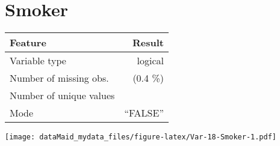 \documentclass[]{report}
\begin{document}
\noindent\makebox[\linewidth]{\rule{\textwidth}{0.4pt}}

\hypertarget{smoker}{%
\section{Smoker}\label{smoker}}

\begin{minipage}{0.75 \textwidth}

\begin{longtable}[]{@{}lr@{}}
\toprule
\begin{minipage}[b]{0.34\columnwidth}\raggedright
Feature\strut
\end{minipage} & \begin{minipage}[b]{0.16\columnwidth}\raggedleft
Result\strut
\end{minipage}\tabularnewline
\midrule
\endhead
\begin{minipage}[t]{0.34\columnwidth}\raggedright
Variable type\strut
\end{minipage} & \begin{minipage}[t]{0.16\columnwidth}\raggedleft
logical\strut
\end{minipage}\tabularnewline
\begin{minipage}[t]{0.34\columnwidth}\raggedright
Number of missing obs.\strut
\end{minipage} & \begin{minipage}[t]{0.16\columnwidth}\raggedleft
1 (0.4 \%)\strut
\end{minipage}\tabularnewline
\begin{minipage}[t]{0.34\columnwidth}\raggedright
Number of unique values\strut
\end{minipage} & \begin{minipage}[t]{0.16\columnwidth}\raggedleft
2\strut
\end{minipage}\tabularnewline
\begin{minipage}[t]{0.34\columnwidth}\raggedright
Mode\strut
\end{minipage} & \begin{minipage}[t]{0.16\columnwidth}\raggedleft
``FALSE''\strut
\end{minipage}\tabularnewline
\bottomrule
\end{longtable}

\end{minipage}
\begin{minipage}{0.25 \textwidth}

\texttt{[image: dataMaid\_mydata\_files/figure-latex/Var-18-Smoker-1.pdf]}

\end{minipage}
\end{document}
